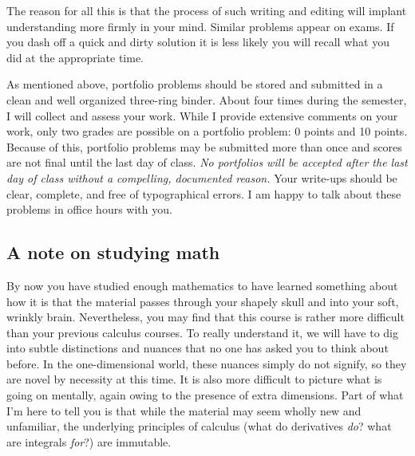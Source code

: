 \documentclass[symmetric]{tufte-handout}
\begin{document}
The reason for all this is that the process of such writing and editing will
implant understanding more firmly in your mind. Similar problems appear on
exams. If you dash off a quick and dirty solution it is less likely you will
recall what you did at the appropriate time.

As mentioned above, portfolio problems should be stored and submitted in a
clean and well organized three-ring binder. About four times during the
semester, I will collect and assess your work. While I provide extensive
comments on your work, only two grades are possible on a portfolio problem: 0
points and 10 points. Because of this, portfolio problems may be submitted
more than once and scores are not final until the last day of class. \emph{No
portfolios will be accepted after the last day of class without a compelling,
documented reason.} Your write-ups should be clear, complete, and free of
typographical errors. I am happy to talk about these problems in office hours
with you. 

\subsection{A note on studying math}

By now you have studied enough mathematics to have learned something about how
it is that the material passes through your shapely skull and into your soft,
wrinkly brain. Nevertheless, you may find that this course is rather more
difficult than your previous calculus courses. To really understand it, we
will have to dig into subtle distinctions and nuances that no one has asked
you to think about before. In the one-dimensional world, these nuances simply
do not signify, so they are novel by necessity at this time. It is also more
difficult to picture what is going on mentally, again owing to the presence of
extra dimensions. Part of what I'm here to tell you is that while the material
may seem wholly new and unfamiliar, the underlying principles of calculus
(what do derivatives \emph{do}? what are integrals \emph{for}?) are immutable.
\end{document}

